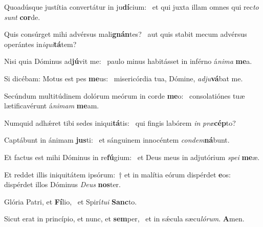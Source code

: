 \item Quoadúsque justítia convertátur in ju\textbf{dí}cium:~\psstar{} et qui juxta illam omnes qui rec\textit{to} \textit{sunt} \textbf{cor}de.

\item Quis consúrget mihi advérsus mali\textbf{gnán}tes?~\psstar{} aut quis stabit mecum advérsus operántes in\textit{iqui}\textbf{tá}tem?

\item Nisi quia Dóminus ad\textbf{jú}vit me:~\psstar{} paulo minus habitásset in inférno á\textit{nima} \textbf{me}a.

\item Si dicébam: Motus est pes \textbf{me}us:~\psstar{} misericórdia tua, Dómine, \textit{adju}\textbf{vá}bat me.

\item Secúndum multitúdinem dolórum meórum in corde \textbf{me}o:~\psstar{} consolatiónes tuæ lætificavérunt á\textit{nimam} \textbf{me}am.

\item Numquid adhǽret tibi sedes iniqui\textbf{tá}tis:~\psstar{} qui fingis labórem \textit{in} \textit{præ}\textbf{cép}to?

\item Captábunt in ánimam \textbf{jus}ti:~\psstar{} et sánguinem innocéntem \textit{condem}\textbf{ná}bunt.

\item Et factus est mihi Dóminus in re\textbf{fú}gium:~\psstar{} et Deus meus in adjutórium \textit{spei} \textbf{me}æ.

\item Et reddet illis iniquitátem ipsórum:~† et in malítia eórum dispérdet \textbf{e}os:~\psstar{} dispérdet illos Dóminus \textit{Deus} \textbf{nos}ter.

\item Glória Patri, et \textbf{Fí}lio,~\psstar{} et Spirí\textit{tui} \textbf{Sanc}to.

\item Sicut erat in princípio, et nunc, et \textbf{sem}per,~\psstar{} et in sǽcula sæcu\textit{lórum}. \textbf{A}men.
